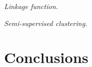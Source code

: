\documentclass{article}
\newcommand{\msnote}[1]{\textcolor{blue}{[MS: #1]}}
\begin{document}



\textit{Linkage function.}

\textit{Semi-supervised clustering.}



\section{Conclusions}
\label{conclusions}






\end{document}
